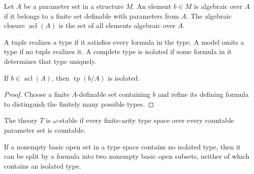 \begin{definition}
\label{def:algebraic-closure}
\leanok
Let \(A\) be a parameter set in a structure \(M\).  An element
\(b\in M\) is algebraic over \(A\) if it belongs to a finite set
definable with parameters from \(A\).  The algebraic closure
\(\operatorname{acl}(A)\) is the set of all elements algebraic over
\(A\).
\end{definition}

\begin{definition}
\label{def:isolated-and-omitted-types}
\leanok
{}
A tuple realizes a type if it satisfies every formula in the type.  A
model omits a type if no tuple realizes it.  A complete type is isolated
if some formula in it determines that type uniquely.
\end{definition}

\begin{proposition}
\label{prop:algebraic-implies-isolated}
\leanok
{}
If \(b\in\operatorname{acl}(A)\), then \(\operatorname{tp}(b/A)\) is
isolated.
\end{proposition}

\begin{proof}
\leanok
Choose a finite \(A\)-definable set containing \(b\) and refine its
defining formula to distinguish the finitely many possible types.
\end{proof}

\begin{definition}
\label{def:omega-stability}
\leanok
{}
The theory \(T\) is \(\omega\)-stable if every finite-arity type space
over every countable parameter set is countable.
\end{definition}

\begin{lemma}
\label{lem:isolated-splitting}
\leanok
{}
If a nonempty basic open set in a type space contains no isolated type,
then it can be split by a formula into two nonempty basic open subsets,
neither of which contains an isolated type.
\end{lemma}

